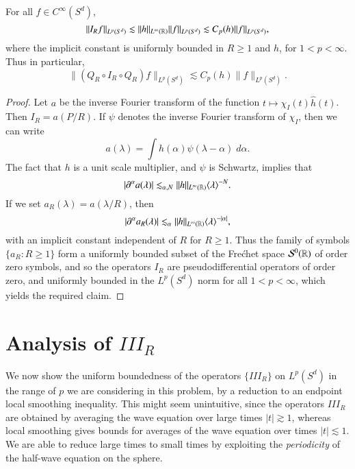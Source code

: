 \begin{lemma} \label{SmallTimeInequalityLemma}
    For all $f \in C^\infty(S^d)$,
    \[ \| I_R f \|_{L^p(S^d)} \lesssim \| h \|_{L^\infty(\operatorname{\mathbb{R}})} \| f \|_{L^p(S^d)} \lesssim C_p(h) \| f \|_{L^p(S^d)}, \] 
    where the implicit constant is uniformly bounded in $R \geq 1$ and $h$, for $1 < p < \infty$. Thus in particular,
    \[ \| (Q_R \circ I_R \circ Q_R) f \|_{L^p(S^d)} \lesssim C_p(h) \| f \|_{L^p(S^d)}. \]
\end{lemma}
\begin{proof}
    Let $a$ be the inverse Fourier transform of the function $t \mapsto \chi_I(t) \widehat{h}(t)$. Then $I_R = a(P/R)$. If $\psi$ denotes the inverse Fourier transform of $\chi_I$, then we can write
    \[ a(\lambda) = \int h(\alpha) \psi(\lambda - \alpha)\; d\alpha. \]
    The fact that $h$ is a unit scale multiplier, and $\psi$ is Schwartz, implies that
    \[ |\partial^\alpha a(\lambda)| \lesssim_{\alpha,N} \| h \|_{L^\infty(\operatorname{\mathbb{R}})} \langle \lambda \rangle^{-N}. \]
    If we set $a_R(\lambda) = a(\lambda / R)$, then
    \[ |\partial^\alpha a_R(\lambda)| \lesssim_\alpha \| h \|_{L^\infty(\operatorname{\mathbb{R}})} \langle \lambda \rangle^{-|\alpha|}, \]
    with an implicit constant independent of $R$ for $R \geq 1$. Thus the family of symbols $\{ a_R : R \geq 1 \}$ form a uniformly bounded subset of the Fre\'{c}het space $\mathcal{S}^0(\operatorname{\mathbb{R}})$ of order zero symbols, and so the operators $I_R$ are pseudodifferential operators of order zero, and uniformly bounded in the $L^p(S^d)$ norm for all $1 < p < \infty$, which yields the required claim.
\end{proof}

\section{Analysis of $III_R$}

We now show the uniform boundedness of the operators $\{ III_R \}$ on $L^p(S^d)$ in the range of $p$ we are considering in this problem, by a reduction to an endpoint local smoothing inequality. This might seem unintuitive, since the operators $III_R$ are obtained by averaging the wave equation over large times $|t| \gtrsim 1$, whereas local smoothing gives bounds for averages of the wave equation over times $|t| \lesssim 1$. We are able to reduce large times to small times by exploiting the \emph{periodicity} of the half-wave equation on the sphere.

